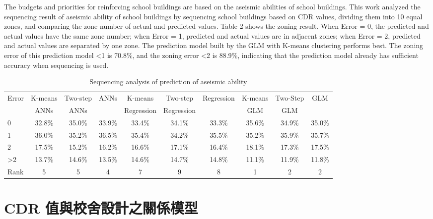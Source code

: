 The budgets and priorities for reinforcing school buildings are based on the aseismic abilities of school buildings. This work analyzed the sequencing result of aseismic ability of school buildings by sequencing school buildings based on CDR values, dividing them into 10 equal zones, and comparing the zone number of actual and predicted values. Table 2 shows the zoning result. When Error = 0, the predicted and actual values have the same zone number; when Error = 1, predicted and actual values are in adjacent zones; when Error = 2, predicted and actual values are separated by one zone. The prediction model built by the GLM with K-means clustering performs best. The zoning error of this prediction model <1 is 70.8\%, and the zoning error <2 is 88.9\%, indicating that the prediction model already has sufficient accuracy when sequencing is used.

\begin{table}[hbtp]
  \begin{center}
    \caption{Sequencing analysis of prediction of aseismic ability}
    \label{tab:is_seq_result}
    \scriptsize
    \begin{tabular}{l c c c c c c c c c}
      \hline
       Error & K-means & Two-step & ANNs & K-means    & Two-step   & Regression & K-means & Two-Step & GLM \\
             &   ANNs  &   ANNs   &      & Regression & Regression &            &   GLM   &   GLM    & \\ 
      \hline
	   0  & 32.8\% & 35.0\% & 33.9\% & 33.4\% & 34.1\% & 33.3\% & 35.6\% & 34.9\% & 35.0\% \\
	   1  & 36.0\% & 35.2\% & 36.5\% & 35.4\% & 34.2\% & 35.5\% & 35.2\% & 35.9\% & 35.7\% \\
	   2  & 17.5\% & 15.2\% & 16.2\% & 16.6\% & 17.1\% & 16.4\% & 18.1\% & 17.3\% & 17.5\% \\
	   >2 & 13.7\% & 14.6\% & 13.5\% & 14.6\% & 14.7\% & 14.8\% & 11.1\% & 11.9\% & 11.8\% \\
      \hline
      Rank & 5 & 5 & 4 & 7 & 9 & 8 & 1 & 2 & 2 \\
      \hline
      \end{tabular}
  \end{center}
\end{table}

\section{CDR 值與校舍設計之關係模型}

